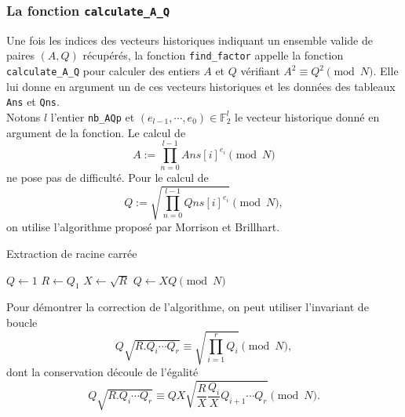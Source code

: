 \begin{algorithm}[H]
\end{algorithm}
\vspace{1em}

\subsubsection{La fonction \texttt{calculate\_A\_Q}}

Une fois les indices des vecteurs historiques indiquant un ensemble valide de
paires $(A, Q)$ récupérés, la fonction \texttt{find\_factor} appelle la
fonction \texttt{calculate\_A\_Q} pour calculer des entiers $A$ et $Q$
vérifiant $A^2 \equiv Q^2 \pmod{N}$. Elle lui donne en argument un de ces
vecteurs historiques et les données des tableaux \texttt{Ans} et \texttt{Qns}.
\\

Notons $l$ l'entier \texttt{nb\_AQp} et $(e_{l-1}, \cdots , e_0) \in
\mathbb{F}_2^{l}$ le vecteur historique donné en argument de la fonction. Le
calcul de \[A:= \prod_{n=0}^{l-1} Ans[i]^{e_i} \pmod{N} \] ne pose pas de
difficulté. Pour le calcul de \[Q:= \sqrt{\prod_{n=0}^{l-1 } Qns[i] ^{e_i}}
\pmod{N},\] on utilise l'algorithme proposé par Morrison et Brillhart.

\vspace{1em}
\begin{algorithm}[H]
\DontPrintSemicolon
\caption{\sc Extraction de racine carrée}
$Q \gets 1$\;
$R \gets Q_1$\;
$X \gets \sqrt{R}$\;
    $Q \gets XQ \pmod{N}$\;
\;
\end{algorithm}
\vspace{1em}

Pour démontrer la correction de l'algorithme, on peut utiliser l'invariant de
boucle \[Q\sqrt{R.Q_i\cdots Q_r} \equiv \sqrt{\prod_{i=1}^r Q_{i}} \pmod{N},\]
dont la conservation découle de l'égalité \[Q\sqrt{R.Q_i\cdots
Q_r} \equiv QX \sqrt{\frac{R}{X}\frac{Q_i}{X}Q_{i+1} \cdots Q_r} \pmod{N}.\]
